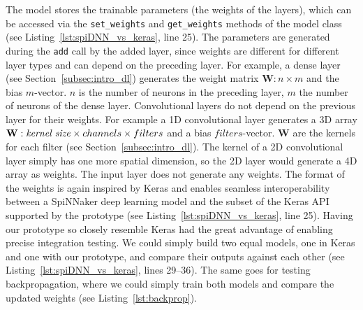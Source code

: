 \documentclass[]{article}
\begin{document}
The model stores the trainable parameters (the weights of the layers),
which can be accessed via the \texttt{set\_weights} and
\texttt{get\_weights} methods of the model class
(see Listing~\ref{lst:spiDNN_vs_keras}, line 25).
The parameters are generated during the \texttt{add} call by the
added layer, since weights are different for different layer types
and can depend on the preceding layer.
For example, a dense layer (see Section~\ref{subsec:intro_dl})
generates the weight matrix $\mathbf{W}: n \times m$ and the bias
$m$-vector.
$n$ is the number of neurons in the preceding layer, $m$ the number of
neurons of the dense layer.
Convolutional layers do not depend on the previous layer for their
weights.
For example a 1D convolutional layer generates a $3$D array
$\mathbf{W}: \text{\textit{kernel size}} \times channels \times
filters$ and a bias $filters$-vector.
$\mathbf{W}$ are the kernels for each filter (see
Section~\ref{subsec:intro_dl}).
The kernel of a 2D convolutional layer simply has one more spatial
dimension, so the 2D layer would generate a 4D array as weights.
The input layer does not generate any weights.
The format of the weights is again inspired by Keras and enables
seamless interoperability between a SpiNNaker deep learning model and
the subset of the Keras API supported by the prototype
(see Listing~\ref{lst:spiDNN_vs_keras}, line 25).
Having our prototype so closely resemble Keras had the great advantage
of enabling precise integration testing.
We could simply build two equal models, one in Keras and one with our
prototype, and compare their outputs against each other
(see Listing~\ref{lst:spiDNN_vs_keras}, lines 29--36).
The same goes for testing backpropagation, where we could simply train
both models and compare the updated weights
(see Listing~\ref{lst:backprop}).
\end{document}
